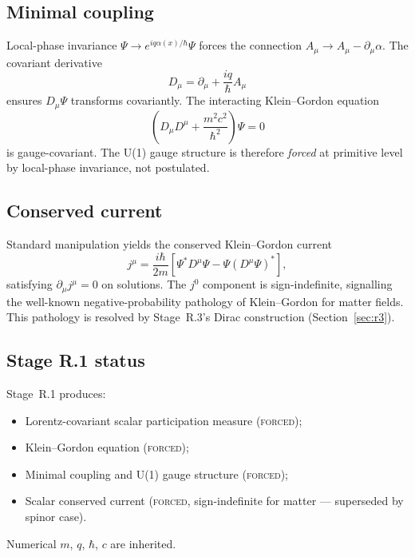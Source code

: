 \documentclass[11pt,a4paper]{article}
\begin{document}
\subsection{Minimal coupling}

Local-phase invariance $\Psi \to e^{iq\alpha(x)/\hbar}\Psi$ forces the connection $A_\mu \to A_\mu - \partial_\mu \alpha$. The covariant derivative
\begin{equation}
D_\mu = \partial_\mu + \frac{iq}{\hbar} A_\mu
\label{eq:Dmu}
\end{equation}
ensures $D_\mu \Psi$ transforms covariantly. The interacting Klein--Gordon equation
\begin{equation}
\left( D_\mu D^\mu + \frac{m^2 c^2}{\hbar^2} \right) \Psi = 0
\end{equation}
is gauge-covariant. The U(1) gauge structure is therefore \emph{forced} at primitive level by local-phase invariance, not postulated.

\subsection{Conserved current}

Standard manipulation yields the conserved Klein--Gordon current
\begin{equation}
j^\mu = \frac{i\hbar}{2m} \left[ \Psi^* D^\mu \Psi - \Psi (D^\mu \Psi)^* \right],
\end{equation}
satisfying $\partial_\mu j^\mu = 0$ on solutions. The $j^0$ component is sign-indefinite, signalling the well-known negative-probability pathology of Klein--Gordon for matter fields. This pathology is resolved by Stage~R.3's Dirac construction (Section~\ref{sec:r3}).

\subsection{Stage R.1 status}

Stage~R.1 produces:
\begin{itemize}
  \item Lorentz-covariant scalar participation measure (\textsc{forced});
  \item Klein--Gordon equation (\textsc{forced});
  \item Minimal coupling and U(1) gauge structure (\textsc{forced});
  \item Scalar conserved current (\textsc{forced}, sign-indefinite for matter --- superseded by spinor case).
\end{itemize}
Numerical $m$, $q$, $\hbar$, $c$ are inherited.
\end{document}
